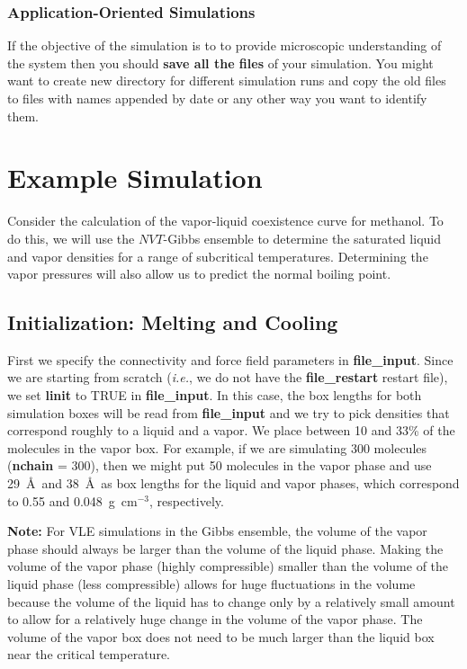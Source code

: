 \documentclass[12pt,letterpaper]{article}
\begin{document}
\subsubsection{Application-Oriented Simulations} If the objective of
the simulation is to to provide microscopic understanding of
the system then you should {\bf save all the files} of your
simulation. You might want to create new directory for
different simulation runs and copy the old files to files
with names appended by date or any other way you want to
identify them.

\section{Example Simulation}
Consider the calculation of the vapor-liquid coexistence
curve for methanol. To do this, we will use the $NVT$-Gibbs
ensemble to determine the saturated liquid and vapor
densities for a range of subcritical temperatures.
Determining the vapor pressures will also allow us to
predict the normal boiling point.

\subsection{Initialization: Melting and Cooling}
First we specify the connectivity and force field parameters
in {\bf file\_input}. Since we are starting from scratch
({\it i.e.}, we do not have the {\bf file\_restart} restart
file), we set {\bf linit} to TRUE in {\bf file\_input}. In
this case, the box lengths for both simulation boxes will be
read from {\bf file\_input} and we try to pick densities
that correspond roughly to a liquid and a vapor. We place
between 10 and 33\% of the molecules in the vapor box. For
example, if we are simulating 300 molecules ({\bf nchain} =
300), then we might put 50 molecules in the vapor phase and
use 29~\AA~and 38~\AA~as box lengths for the liquid and
vapor phases, which correspond to 0.55 and
0.048~g~cm$^{-3}$, respectively.

{\bf Note:} For VLE simulations in the Gibbs ensemble, the
volume of the vapor phase should always be larger than the
volume of the liquid phase. Making the volume of the vapor
phase (highly compressible) smaller than the volume of the
liquid phase (less compressible) allows for huge
fluctuations in the volume because the volume of the liquid
has to change only by a relatively small amount to allow for
a relatively huge change in the volume of the vapor phase.
The volume of the vapor box does not need to be much
larger than the liquid box near the critical temperature.
\end{document}
